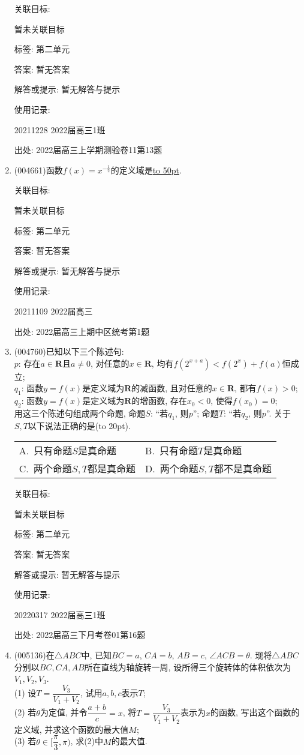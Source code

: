\documentclass[10pt,a4paper]{article}
\newcommand{\blank}[1]{\underline{\hbox to #1pt{}}}
\newcommand{\bracket}[1]{(\hbox to #1pt{})}
\newcommand{\twoch}[4]{\par\begin{tabular}{p{.46\textwidth}p{.46\textwidth}}
A.~#1& B.~#2\\
C.~#3& D.~#4
\end{tabular}}
\begin{document}
\begin{enumerate}[1.]
关联目标:

暂未关联目标



标签: 第二单元

答案: 暂无答案

解答或提示: 暂无解答与提示

使用记录:

20211228	2022届高三1班	


出处: 2022届高三上学期测验卷11第13题
\item { (004661)}函数$f(x)={x^{-\frac 12}}$的定义域是\blank{50}.


关联目标:

暂未关联目标



标签: 第二单元

答案: 暂无答案

解答或提示: 暂无解答与提示

使用记录:

20211109	2022届高三	


出处: 2022届高三上期中区统考第1题
\item { (004760)}已知以下三个陈述句:\\
$p$: 存在$a\in \mathbf{R}$且$a\ne 0$, 对任意的$x\in \mathbf{R}$, 均有$f(2^{x+a})<f(2^x)+f(a)$恒成立;\\
$q_1$: 函数$y=f(x)$是定义域为$\mathbf{R}$的减函数, 且对任意的$x\in \mathbf{R}$, 都有$f(x)>0$;\\
$q_2$: 函数$y=f(x)$是定义域为$\mathbf{R}$的增函数, 存在$x_0<0$, 使得$f(x_0)=0$;\\
用这三个陈述句组成两个命题, 命题$S$: ``若$q_1$, 则$p$''; 命题$T$: ``若$q_2$, 则$p$''. 关于$S,T$以下说法正确的是\bracket{20}.
\twoch{只有命题$S$是真命题}{只有命题$T$是真命题}{两个命题$S,T$都是真命题}{两个命题$S,T$都不是真命题}


关联目标:

暂未关联目标



标签: 第二单元

答案: 暂无答案

解答或提示: 暂无解答与提示

使用记录:

20220317	2022届高三1班	


出处: 2022届高三下月考卷01第16题
\item { (005136)}在$\triangle ABC$中, 已知$BC=a$, $CA=b$, $AB=c$, $\angle ACB=\theta$. 现将$\triangle ABC$分别以$BC,CA,AB$所在直线为轴旋转一周, 设所得三个旋转体的体积依次为$V_1,V_2,V_3$.\\
(1) 设$T=\dfrac{V_3}{V_1+V_2}$, 试用$a,b,c$表示$T$;\\
(2) 若$\theta$为定值, 并令$\dfrac{a+b}c=x$, 将$T=\dfrac{V_3}{V_1+V_2}$表示为$x$的函数, 写出这个函数的定义域, 并求这个函数的最大值$M$;\\
(3) 若$\theta \in [\dfrac{\pi }3,\pi)$, 求(2)中$M$的最大值.



\end{enumerate}
\end{document}
